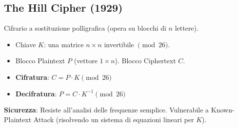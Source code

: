 \subsection{The Hill Cipher (1929)}
Cifrario a sostituzione polligrafica (opera su blocchi di $n$ lettere).
\begin{itemize}
    \item Chiave $K$: una matrice $n \times n$ invertibile $\pmod{26}$.
    \item Blocco Plaintext $P$ (vettore $1 \times n$). Blocco Ciphertext $C$.
    \item \textbf{Cifratura}: $C = P \cdot K \pmod{26}$
    \item \textbf{Decifratura}: $P = C \cdot K^{-1} \pmod{26}$
\end{itemize}
\textbf{Sicurezza}: Resiste all'analisi delle frequenze semplice. Vulnerabile a Known-Plaintext Attack (risolvendo un sistema di equazioni lineari per $K$).

